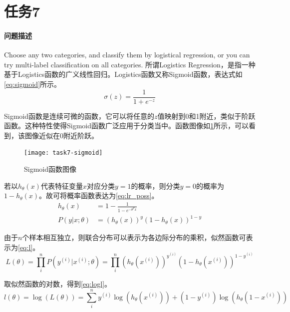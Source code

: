 \documentclass[a4paper,12pt]{article}
\begin{document}
    \section{任务7} %
    \paragraph{问题描述} Choose any two categories, and classify them by logistical regression, or you can try multi-label classification on all categories.
    所谓Logistics Regression，是指一种基于Logistics函数的广义线性回归。Logistics函数又称Sigmoid函数，表达式如\cref{eq:sigmoid}所示。\cite{施朝健2005logistic}
    \begin{equation}
      \label{eq:sigmoid}
      \sigma(z) = \frac{1}{1+e^{-z}}
    \end{equation}

    Sigmoid函数是连续可微的函数，它可以将任意的$z$值映射到0和1附近，类似于阶跃函数。这种特性使得Sigmoid函数广泛应用于分类当中。函数图像如\cref{fig:sigmoid}所示，可以看到，该图像近似在0附近阶跃。
    \begin{figure}
      \centering
      \texttt{[image: task7-sigmoid]}
      \caption{Sigmoid函数图像}
      \label{fig:sigmoid}
    \end{figure}

    若以$h_\theta(x)$代表特征变量$x$对应分类$y=1$的概率，则分类$y=0$的概率为$1-h_\theta(x)$。故可将概率函数表达为\cref{eq:lr_poss}。
    \begin{equation}
      \label{eq:lr_poss}
      \begin{aligned}
        h_\theta(x) &= 1-\frac{1}{1-e^{-\theta^T x}} \\
        P(y|x;\theta) &= (h_\theta(x))^y (1-h_\theta(x))^{1-y}
      \end{aligned}
    \end{equation}

    由于$n$个样本相互独立，则联合分布可以表示为各边际分布的乘积，似然函数可表示为\cref{eq:l}。
    \begin{equation}
      \label{eq:l}
      L(\theta) = \prod_{i}^n {P(y^{(i)}|x^{(i)};\theta)} = \prod_{i}^n {(h_\theta(x^{(i)}))^{y^{(i)}} (1-h_\theta(x^{(i)}))^{1-y^{(i)}}}
    \end{equation}

    取似然函数的对数，得到\cref{eq:logl}。
    \begin{equation}
      \label{eq:logl}
      l(\theta) = \log(L(\theta)) = \sum_{i}^n {y^{(i)} \log(h_\theta(x^{(i)})) + (1 - y^{(i)}) \log(h_\theta(1-x^{(i)}))}
    \end{equation}
\end{document}
